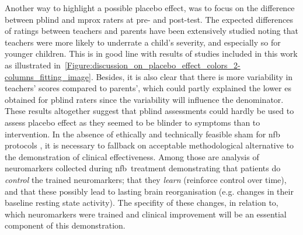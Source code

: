 Another way to highlight a possible placebo effect, was to focus on the difference between \gls{pblind} and \gls{mprox}
raters at pre- and post-test. The expected differences of ratings between teachers and parents have been extensively
studied \citep{Sollie2013, Narad2015, Minder2018} noting that teachers were more likely to underrate a child's severity,
and especially so for younger children. This is in good line with results of studies included in this work as illustrated in~\ref{Figure:discussion_on_placebo_effect_colors_2-columns_fitting_image}.  
Besides, it is also clear that there is more variability in
teachers' scores compared to parents', which could partly explained the lower \gls{es} obtained for \gls{pblind} raters
since the variability will influence the denominator. 
These results altogether suggest that \gls{pblind} assessments could hardly be used to assess placebo effect as they seemed
to be blinder to symptoms than to intervention. 
In the absence of ethically \cite{} and technically \cite{} feasible sham for \gls{nfb} protocols \citep{World-Medical-Association2000}, it
is necessary to fallback on acceptable methodological alternative to the demonstration of clinical effectiveness. Among
those are analysis of neuromarkers collected during \gls{nfb} treatment demonstrating that patients do \emph{control} the
trained neuromarkers; that they \emph{learn} (reinforce control over time), and that these possibly lead to lasting brain
reorganisation (e.g. changes in their baseline resting state activity). The specifity of these changes, in relation to,
which neuromarkers were trained and clinical improvement will be an essential component of this demonstration.  


